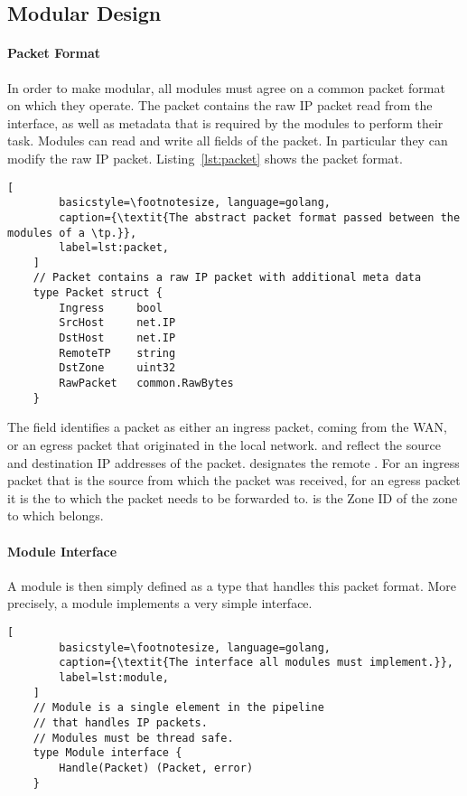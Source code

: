 \subsection{Modular Design}
\label{ssec:mod_design}

\paragraph{Packet Format}
In order to make \tps modular, all modules must agree on a common packet format on which they
operate. The packet contains the raw IP packet read from the interface, as well as metadata
that is required by the modules to perform their task. Modules can read and write all fields of the
packet. In particular they can modify the raw IP packet.
Listing~\ref{lst:packet} shows the packet format.

\begin{minipage}{\linewidth}
	\begin{lstlisting}[
		basicstyle=\footnotesize, language=golang,
		caption={\textit{The abstract packet format passed between the modules of a \tp.}},
		label=lst:packet,
	]
	// Packet contains a raw IP packet with additional meta data
	type Packet struct {
		Ingress		bool
		SrcHost 	net.IP
		DstHost 	net.IP
		RemoteTP	string
		DstZone		uint32
		RawPacket 	common.RawBytes
	}
	\end{lstlisting}
\end{minipage}

The field identifies a packet as either an ingress packet,
coming from the WAN, or an egress packet
that originated in the local network.  and  reflect
the source and destination IP addresses of the packet.  designates
the remote \tp. For an ingress packet that is the source \tp from which the packet
was received, for an egress packet it is the \tp to which the packet needs to be
forwarded to.  is the Zone ID of the zone to which 
belongs.

\paragraph{Module Interface}
A module is then simply defined as a type that handles this packet format.
More precisely, a module implements a very simple  interface.

\begin{minipage}{\linewidth}
	\begin{lstlisting}[
		basicstyle=\footnotesize, language=golang,
		caption={\textit{The interface all modules must implement.}},
		label=lst:module,
	]
	// Module is a single element in the pipeline
	// that handles IP packets.
	// Modules must be thread safe.
	type Module interface {
		Handle(Packet) (Packet, error)
	}
	\end{lstlisting}
\end{minipage}


